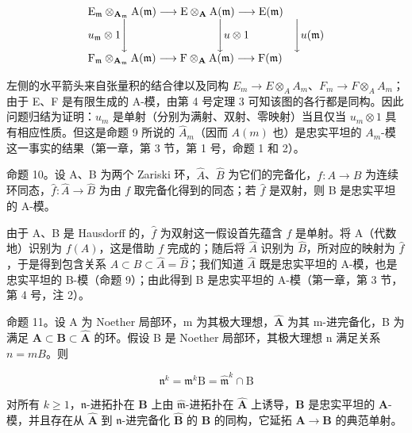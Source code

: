 \[
\begin{array}{l} \mathrm{E} _ {\mathfrak {m}} \otimes_ {\mathbf {A} _ {\mathfrak {m}}} \mathrm{A} (\mathfrak {m}) \longrightarrow \mathrm{E} \otimes_ {\mathbf {A}} \mathrm{A} (\mathfrak {m}) \longrightarrow \mathrm{E} (\mathfrak {m}) \\ u _ {\mathfrak {m}} \otimes 1 \Biggl \downarrow \qquad \qquad \qquad \qquad \Biggl \downarrow u \otimes 1 \qquad \qquad \Biggl \downarrow u (\mathfrak {m}) \\ \mathrm{F} _ {\mathfrak {m}} \otimes_ {\mathbf {A} _ {\mathfrak {m}}} \mathrm{A} (\mathfrak {m}) \longrightarrow \mathrm{F} \otimes_ {\mathbf {A}} \mathrm{A} (\mathfrak {m}) \longrightarrow \mathrm{F} (\mathfrak {m}) \end{array}
\]

左侧的水平箭头来自张量积的结合律以及同构 \(E_{m} \rightarrow E \otimes_{A} A_{m}\)、\(F_{m} \rightarrow F \otimes_{A} A_{m}\)；由于 E、F 是有限生成的 A-模，由第 4 号定理 3 可知该图的各行都是同构。因此问题归结为证明：\(u_{m}\) 是单射（分别为满射、双射、零映射）当且仅当 \(u_{m} \otimes 1\) 具有相应性质。但这是命题 9 所说的 \(\hat{A}_{m}\)（因而 \(A(m)\) 也）是忠实平坦的 \(A_{m}\)-模这一事实的结果（第一章，第 3 节，第 1 号，命题 1 和 2）。

命题 10。设 A、B 为两个 Zariski 环，\(\hat{A}\)、\(\hat{B}\) 为它们的完备化，\(f\colon A\to B\) 为连续环同态，\(\hat{f}\colon\hat{A}\to\hat{B}\) 为由 \(f\) 取完备化得到的同态；若 \(\hat{f}\) 是双射，则 B 是忠实平坦的 A-模。

由于 A、B 是 Hausdorff 的，\(\hat{f}\) 为双射这一假设首先蕴含 \(f\) 是单射。将 A（代数地）识别为 \(f(A)\)，这是借助 \(f\) 完成的；随后将 \(\hat{A}\) 识别为 \(\hat{B}\)，所对应的映射为 \(\hat{f}\)，于是得到包含关系 \(A \subset B \subset \hat{A} = \hat{B}\)；我们知道 \(\hat{A}\) 既是忠实平坦的 A-模，也是忠实平坦的 B-模（命题 9）；由此得到 B 是忠实平坦的 A-模（第一章，第 3 节，第 4 号，注 2）。

命题 11。设 A 为 Noether 局部环，m 为其极大理想，\(\hat{\mathbf{A}}\) 为其 m-进完备化，B 为满足 \(\mathbf{A} \subset \mathbf{B} \subset \hat{\mathbf{A}}\) 的环。假设 B 是 Noether 局部环，其极大理想 n 满足关系 \(n = mB\)。则

\[
\mathfrak {n} ^ {k} = \mathfrak {m} ^ {k} \mathrm{B} = \hat {\mathfrak {m}} ^ {k} \cap \mathrm{B}
\]

对所有 \(k \geqslant 1\)，\(\mathfrak{n}\)-进拓扑在 \(\mathbf{B}\) 上由 \(\hat{\mathfrak{m}}\)-进拓扑在 \(\hat{\mathbf{A}}\) 上诱导，\(\mathbf{B}\) 是忠实平坦的 \(\mathbf{A}\)-模，并且存在从 \(\hat{\mathbf{A}}\) 到 \(\mathfrak{n}\)-进完备化 \(\hat{\mathbf{B}}\) 的 \(\mathbf{B}\) 的同构，它延拓 \(\mathbf{A} \to \mathbf{B}\) 的典范单射。

